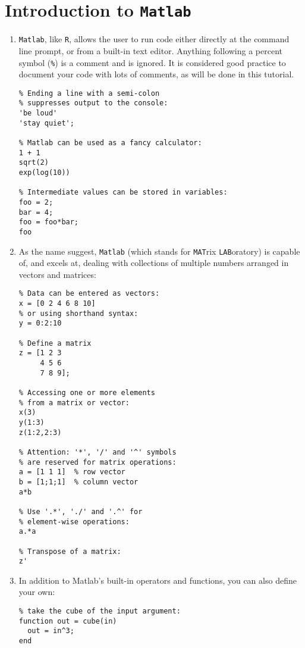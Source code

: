 \section{Introduction to \texttt{Matlab}}
\label{sec:Matlab}

\begin{enumerate}
\item \texttt{Matlab}, like \texttt{R}, allows the user to run code
  either directly at the command line prompt, or from a built-in text
  editor. Anything following a percent symbol (\texttt{\%}) is a
  comment and is ignored. It is considered good practice to document
  your code with lots of comments, as will be done in this tutorial.
  
\begin{verbatim}
% Ending a line with a semi-colon 
% suppresses output to the console:
'be loud'
'stay quiet';

% Matlab can be used as a fancy calculator:
1 + 1
sqrt(2)
exp(log(10))

% Intermediate values can be stored in variables:
foo = 2;
bar = 4;
foo = foo*bar;
foo
\end{verbatim}

\item As the name suggest, \texttt{Matlab} (which stands for
  \texttt{MAT}rix \texttt{LAB}oratory) is capable of, and excels at,
  dealing with collections of multiple numbers arranged in vectors and
  matrices:

\begin{verbatim}
% Data can be entered as vectors:
x = [0 2 4 6 8 10]
% or using shorthand syntax:
y = 0:2:10

% Define a matrix
z = [1 2 3
     4 5 6
     7 8 9];

% Accessing one or more elements 
% from a matrix or vector:
x(3)
y(1:3)
z(1:2,2:3)

% Attention: '*', '/' and '^' symbols
% are reserved for matrix operations:
a = [1 1 1]  % row vector
b = [1;1;1]  % column vector
a*b

% Use '.*', './' and '.^' for 
% element-wise operations:
a.*a

% Transpose of a matrix:
z'
\end{verbatim}

\item In addition to Matlab's built-in operators and functions, you
  can also define your own:
  
\begin{verbatim}
% take the cube of the input argument:
function out = cube(in)
  out = in^3;
end
\end{verbatim}


\end{enumerate}
